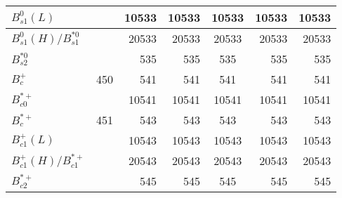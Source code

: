 \begin{tabular}{|l@{\tstrut}|r|r|r|c|r|r|}
$B_{s1}^0(L)$             &     & 10533  & 10533 & 10533 & 10533 & 10533 \\ \hline
$B_{s1}^0(H)/B_{s1}^{*0}$ &     & 20533  & 20533 & 20533 & 20533 & 20533 \\ \hline
$B_{s2}^{*0}$             &     &   535  &   535 & 535 &   535 & 535 \\ \hline\hline
$B_c^+$                   & 450 &   541  &   541 &   541 &   541 & 541 \\ \hline
$B_{c0}^{*+}$             &     & 10541  & 10541 &     10541    & 10541 & 10541 \\ \hline
$B_c^{*+}$                & 451 &   543  &   543 &   543 &   543 & 543 \\ \hline
$B_{c1}^+(L)$             &     & 10543  & 10543 &   10543      & 10543 & 10543 \\ \hline
$B_{c1}^+(H)/B_{c1}^{*+}$ &     & 20543  & 20543 &     20543    & 20543 & 20543 \\ \hline
$B_{c2}^{*+}$             &     &   545  &   545 &      545   &   545 & 545 \\ \hline
\end{tabular}

